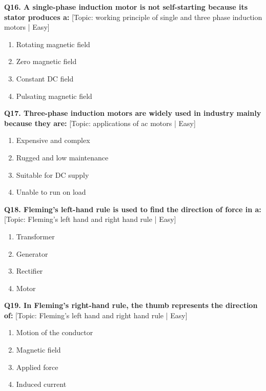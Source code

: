 \noindent\textbf{Q16. A single-phase induction motor is not self-starting because its stator produces a:} \hfill [Topic: working principle of single and three phase induction motors | Easy]
\begin{enumerate}[label=(\alph*),topsep=2pt,itemsep=1pt,partopsep=0pt,parsep=0pt]
    \item {Rotating magnetic field}
    \item {Zero magnetic field}
    \item {Constant DC field}
    \item {Pulsating magnetic field}
\end{enumerate}
\vspace{2mm}

\noindent\textbf{Q17. Three-phase induction motors are widely used in industry mainly because they are:} \hfill [Topic: applications of ac motors | Easy]
\begin{enumerate}[label=(\alph*),topsep=2pt,itemsep=1pt,partopsep=0pt,parsep=0pt]
    \item {Expensive and complex}
    \item {Rugged and low maintenance}
    \item {Suitable for DC supply}
    \item {Unable to run on load}
\end{enumerate}
\vspace{2mm}

\noindent\textbf{Q18. Fleming's left-hand rule is used to find the direction of force in a:} \hfill [Topic: Fleming's left hand and right hand rule | Easy]
\begin{enumerate}[label=(\alph*),topsep=2pt,itemsep=1pt,partopsep=0pt,parsep=0pt]
    \item {Transformer}
    \item {Generator}
    \item {Rectifier}
    \item {Motor}
\end{enumerate}
\vspace{2mm}

\noindent\textbf{Q19. In Fleming's right-hand rule, the thumb represents the direction of:} \hfill [Topic: Fleming's left hand and right hand rule | Easy]
\begin{enumerate}[label=(\alph*),topsep=2pt,itemsep=1pt,partopsep=0pt,parsep=0pt]
    \item {Motion of the conductor}
    \item {Magnetic field}
    \item {Applied force}
    \item {Induced current}
\end{enumerate}
\vspace{2mm}

